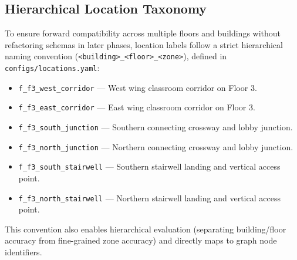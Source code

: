\documentclass[10pt,a4paper]{article}
\begin{document}
\subsection{Hierarchical Location Taxonomy}
To ensure forward compatibility across multiple floors and buildings without refactoring schemas in later phases, location labels follow a strict hierarchical naming convention (\texttt{<building>\_<floor>\_<zone>}), defined in \texttt{configs/locations.yaml}:
\begin{itemize}
    \item \texttt{f\_f3\_west\_corridor} --- West wing classroom corridor on Floor 3.
    \item \texttt{f\_f3\_east\_corridor} --- East wing classroom corridor on Floor 3.
    \item \texttt{f\_f3\_south\_junction} --- Southern connecting crossway and lobby junction.
    \item \texttt{f\_f3\_north\_junction} --- Northern connecting crossway and lobby junction.
    \item \texttt{f\_f3\_south\_stairwell} --- Southern stairwell landing and vertical access point.
    \item \texttt{f\_f3\_north\_stairwell} --- Northern stairwell landing and vertical access point.
\end{itemize}
This convention also enables hierarchical evaluation (separating building/floor accuracy from fine-grained zone accuracy) and directly maps to graph node identifiers.
\end{document}
